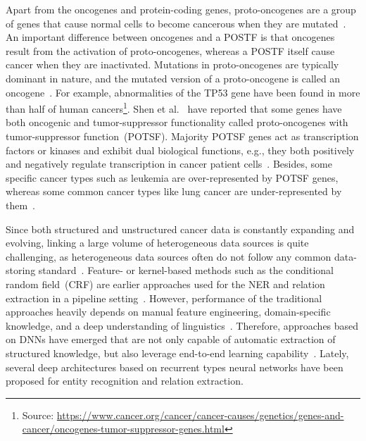\hspace*{3.5mm} Apart from the oncogenes and protein-coding genes, proto-oncogenes are a group of genes that cause normal cells to become cancerous when they are mutated~\cite{slamon1987proto}. An important difference between oncogenes and a POSTF is that oncogenes result from the activation of proto-oncogenes, whereas a POSTF itself cause cancer when they are inactivated. Mutations in proto-oncogenes are typically dominant in nature, and the mutated version of a proto-oncogene is called an oncogene~\cite{slamon1987proto}. For example, abnormalities of the TP53 gene have been found in more than half of human cancers\footnote{Source: \url{https://www.cancer.org/cancer/cancer-causes/genetics/genes-and-cancer/oncogenes-tumor-suppressor-genes.html}}. \hspace*{3.5mm} Shen et al.~\cite{POSTF} have reported that some genes have both oncogenic and tumor-suppressor functionality called proto-oncogenes with tumor-suppressor function~(POTSF). Majority POTSF genes act as transcription factors or kinases and exhibit dual biological functions, e.g., they both positively and negatively regulate transcription in cancer patient cells~\cite{POSTF}. Besides, some specific cancer types such as leukemia are over-represented by POTSF genes, whereas some common cancer types like lung cancer are under-represented by them~\cite{POSTF}. 

\hspace*{3.5mm} Since both structured and unstructured cancer data is constantly expanding and evolving, linking a large volume of heterogeneous data sources is quite challenging, as heterogeneous data sources often do not follow any common data-storing standard~\cite{hasan2020knowledge}. Feature- or kernel-based methods such as the conditional random field~(CRF) are earlier approaches used for the NER and relation extraction in a pipeline setting~\cite{xue2019fine}. However, performance of the traditional approaches heavily depends on manual feature engineering, domain-specific knowledge, and a deep understanding of linguistics~\cite{xue2019fine}. Therefore, approaches based on DNNs have emerged that are not only capable of automatic extraction of structured knowledge, but also leverage end-to-end learning capability~\cite{dogan2019fine}. Lately, several deep architectures based on recurrent types neural networks have been proposed for entity recognition and relation extraction. 

